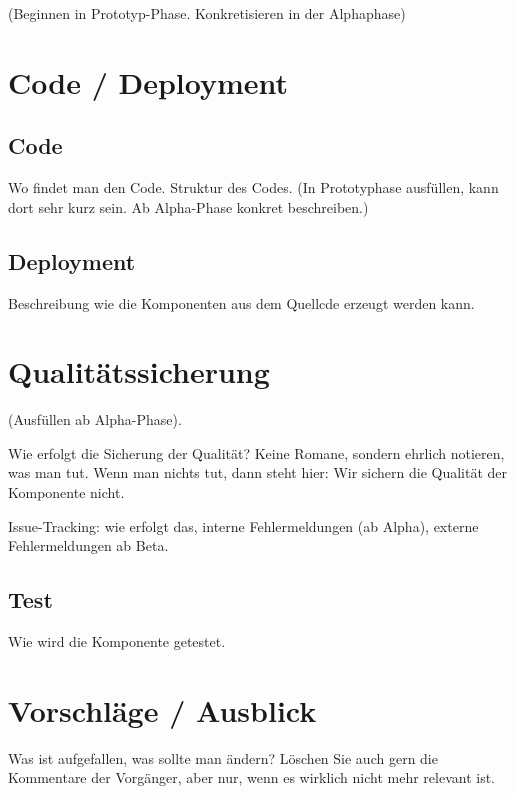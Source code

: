 (Beginnen in Prototyp-Phase. Konkretisieren in der Alphaphase)

\section{Code / Deployment}
\subsection{Code}
Wo findet man den Code. Struktur des Codes. (In Prototyphase ausf\"ullen,
kann dort sehr kurz sein. Ab Alpha-Phase konkret beschreiben.)

\subsection{Deployment}
Beschreibung wie die Komponenten aus dem Quellcde erzeugt werden kann.

\section{Qualit\"atssicherung}
(Ausf\"ullen ab Alpha-Phase).

Wie erfolgt die Sicherung der Qualit\"at? Keine Romane, sondern ehrlich notieren,
was man tut. Wenn man nichts tut, dann steht hier: Wir sichern die Qualit\"at der
Komponente nicht.

Issue-Tracking: wie erfolgt das, interne Fehlermeldungen (ab Alpha),
externe Fehlermeldungen ab Beta.

\subsection{Test}
Wie wird die Komponente getestet.

\section{Vorschl\"age / Ausblick}
Was ist aufgefallen, was sollte man \"andern? L\"oschen Sie auch gern die Kommentare
der Vorg\"anger, aber nur, wenn es wirklich nicht mehr relevant ist.

